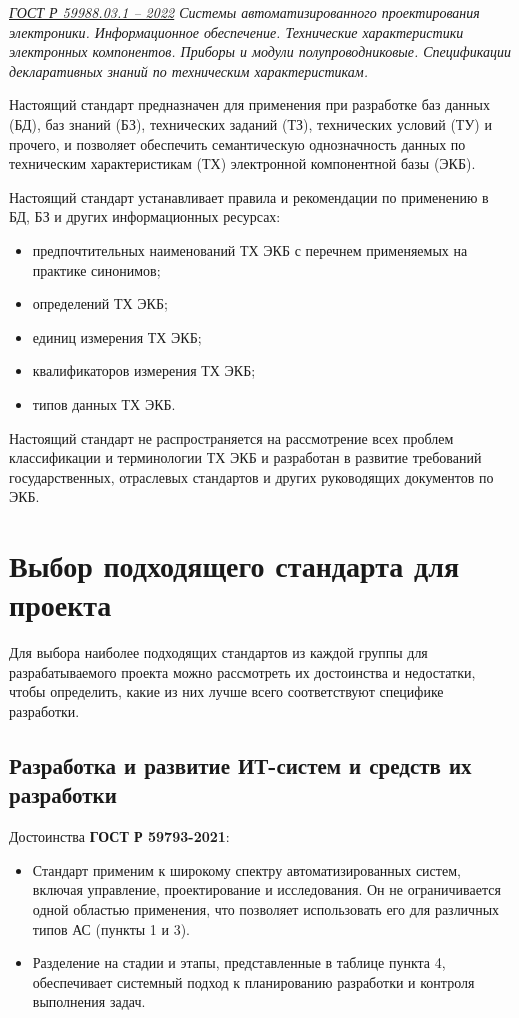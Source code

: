 \emph{\href{https://docs.cntd.ru/document/1200195155}{ГОСТ Р 59988.03.1 -- 2022}
Системы автоматизированного проектирования электроники.
Информационное обеспечение.
Технические характеристики электронных компонентов.
Приборы и модули полупроводниковые.
Спецификации декларативных знаний по техническим характеристикам.
}

Настоящий стандарт предназначен для применения при разработке
баз данных (БД), баз знаний (БЗ), технических заданий (ТЗ),
технических условий (ТУ) и прочего,
и позволяет обеспечить семантическую однозначность данных
по техническим характеристикам (ТХ) электронной компонентной базы (ЭКБ).

Настоящий стандарт устанавливает правила и рекомендации
по применению в БД, БЗ и других информационных ресурсах:

\begin{itemize}
	\item предпочтительных наименований ТХ ЭКБ
		с перечнем применяемых на практике синонимов;
	\item определений ТХ ЭКБ;
	\item единиц измерения ТХ ЭКБ;
	\item квалификаторов измерения ТХ ЭКБ;
	\item типов данных ТХ ЭКБ.
\end{itemize}

Настоящий стандарт не распространяется на рассмотрение
всех проблем классификации и терминологии ТХ ЭКБ
и разработан в развитие требований государственных, отраслевых стандартов
и других руководящих документов по ЭКБ.

\clearpage

\section{Выбор подходящего стандарта для проекта}

Для выбора наиболее подходящих стандартов из каждой группы
для разрабатываемого проекта можно рассмотреть их достоинства и недостатки,
чтобы определить, какие из них лучше всего соответствуют специфике разработки.

\subsection{Разработка и развитие ИТ-систем и средств их разработки}

Достоинства \textbf{ГОСТ Р 59793-2021}:

\begin{itemize}
	\item Стандарт применим к широкому спектру автоматизированных систем,
		включая управление, проектирование и исследования.
		Он не ограничивается одной областью применения,
		что позволяет использовать его для различных типов АС (пункты 1 и 3).
	\item Разделение на стадии и этапы, представленные в таблице пункта 4,
		обеспечивает системный подход к планированию разработки
		и контроля выполнения задач.
\end{itemize}

